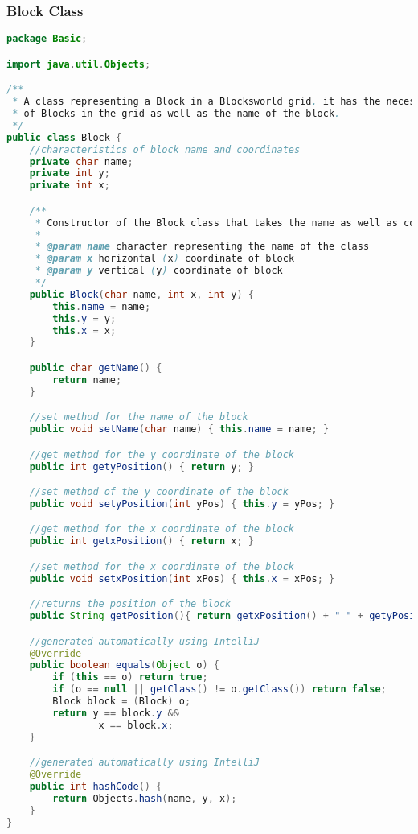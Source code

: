 \documentclass[a4paper, 11pt]{article} %
\begin{document}
\subsubsection{Block Class}
\begin{lstlisting}[language=java]
package Basic;

import java.util.Objects;

/**
 * A class representing a Block in a Blocksworld grid. it has the necessary parameters to represent the positions
 * of Blocks in the grid as well as the name of the block.
 */
public class Block {
    //characteristics of block name and coordinates
    private char name;
    private int y;
    private int x;

    /**
     * Constructor of the Block class that takes the name as well as coordinates of a block
     *
     * @param name character representing the name of the class
     * @param x horizontal (x) coordinate of block
     * @param y vertical (y) coordinate of block
     */
    public Block(char name, int x, int y) {
        this.name = name;
        this.y = y;
        this.x = x;
    }

    public char getName() {
        return name;
    }

    //set method for the name of the block
    public void setName(char name) { this.name = name; }

    //get method for the y coordinate of the block
    public int getyPosition() { return y; }

    //set method of the y coordinate of the block
    public void setyPosition(int yPos) { this.y = yPos; }

    //get method for the x coordinate of the block
    public int getxPosition() { return x; }

    //set method for the x coordinate of the block
    public void setxPosition(int xPos) { this.x = xPos; }

    //returns the position of the block
    public String getPosition(){ return getxPosition() + " " + getyPosition(); }

    //generated automatically using IntelliJ
    @Override
    public boolean equals(Object o) {
        if (this == o) return true;
        if (o == null || getClass() != o.getClass()) return false;
        Block block = (Block) o;
        return y == block.y &&
                x == block.x;
    }

    //generated automatically using IntelliJ
    @Override
    public int hashCode() {
        return Objects.hash(name, y, x);
    }
}

\end{lstlisting}
\end{document}
